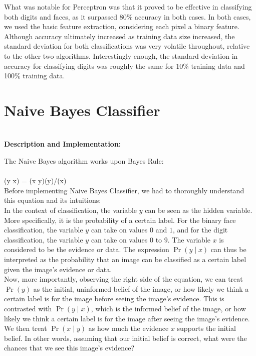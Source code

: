 \documentclass{article}
\begin{document}
What was notable for Perceptron was that it proved to be effective in classifying both digits and faces, as it surpassed 80\% accuracy in both cases. In both cases, we used the basic feature extraction, considering each pixel a binary feature. Although accuracy ultimately increased as training data size increased, the standard deviation for both classifications was very volatile throughout, relative to the other two algorithms. Interestingly enough, the standard deviation in accuracy for classifying digits was roughly the same for 10\% training data and 100\% training data.


\section{Naive Bayes Classifier}\\

\textbf{Description and Implementation:}

The Naive Bayes algorithm works upon Bayes Rule:\\
\\
\Pr(y \mid x) = \Pr(x \mid y)\Pr(y)/\Pr(x)\\

Before implementing Naive Bayes Classifier, we had to thoroughly understand this equation and its intuitions: \\

In the context of classification, the variable $y$ can be seen as the hidden variable. More specifically, it is the probability of a certain label. For the binary face classification, the variable $y$ can take on values $0$ and $1$, and for the digit classification, the variable $y$ can take on values $0$ to $9$. The variable $x$ is considered to be the evidence or data. The expression $\Pr(y \mid x)$ can thus be interpreted as the probability that an image can be classified as a certain label given the image's evidence or data. 
\\

Now, more importantly, observing the right side of the equation, we can treat $\Pr(y)$ as the initial, uninformed belief of the image, or how likely we think a certain label is for the image before seeing the image's evidence. This is contrasted with $\Pr(y \mid x)$, which is the informed belief of the image, or how likely we think a certain label is for the image after seeing the image's evidence. We then treat $\Pr(x \mid y)$ as how much the evidence $x$ supports the initial belief. In other words, assuming that our initial belief is correct, what were the chances that we see this image's evidence? 
\\
\end{document}
